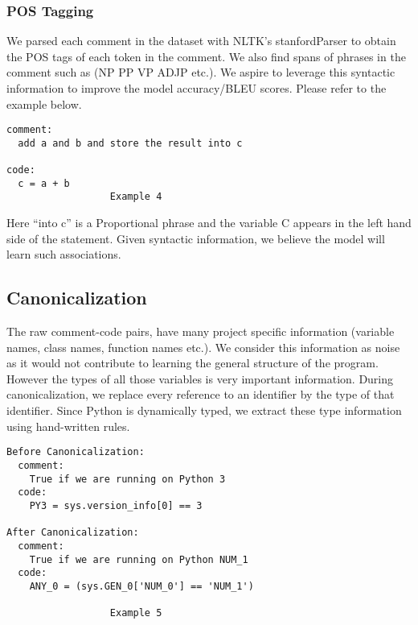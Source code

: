 \documentclass{IEEEtran}
\begin{document}
      \subsubsection{POS Tagging}
        We parsed each comment in the dataset with NLTK's stanfordParser to obtain
        the POS tags of each token in the comment. We also find spans of phrases
        in the comment such as (NP PP VP ADJP etc.). We aspire to leverage this
        syntactic information to improve the model accuracy/BLEU scores.
        Please refer to the example below.
      \begin{lstlisting}[frame=single,basicstyle=\small]
comment:  
  add a and b and store the result into c

code:
  c = a + b
                  Example 4
      \end{lstlisting}

      Here ``into c'' is a Proportional phrase and the variable C appears in the left hand side of the statement. 
        Given syntactic information, we believe the model will learn such associations.

    \subsection{Canonicalization}
    The raw comment-code pairs, have many project specific information                                                                                              
          (variable names, class names, function names etc.). We consider this                                                                                            
          information as noise as it would not contribute to learning the                                                                                                 
          general structure of the program. However the types of all those variables                                                                                      
          is very important information. During canonicalization, we replace every                                                                                        
          reference to an identifier by the type of that identifier. Since Python                                                                                         
          is dynamically typed, we extract these type information using hand-written rules.

    \begin{lstlisting}[frame=single,basicstyle=\small]
Before Canonicalization:
  comment:
    True if we are running on Python 3
  code:
    PY3 = sys.version_info[0] == 3

After Canonicalization:
  comment:
    True if we are running on Python NUM_1
  code:                                     
    ANY_0 = (sys.GEN_0['NUM_0'] == 'NUM_1')

                  Example 5
    \end{lstlisting}
\end{document}
